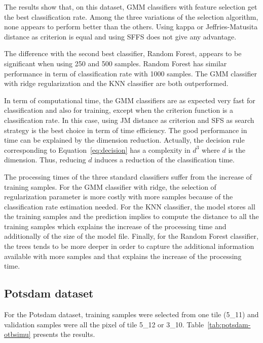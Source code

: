 \documentclass[journal]{IEEEtran}
\begin{document}
    The results show that, on this  dataset, GMM classifiers with feature selection get the best classification rate. Among the three variations of the selection algorithm, none appears to perform better than the others. Using kappa or Jeffries-Matusita distance as criterion is equal and using SFFS does not give any advantage.

    The difference with the second best classifier, Random Forest, appears to be significant when using 250 and 500 samples. Random Forest has similar performance in term of classification rate with 1000 samples. The GMM classifier with ridge regularization and the KNN classifier are both outperformed.

    In term of computational time, the GMM classifiers are as expected very fast for classification and also for training, except when the criterion function is a classification rate. In this case, using JM distance as criterion and SFS as search strategy is the best choice in term of time efficiency. The good performance in time can be explained by the dimension reduction. Actually, the decision rule corresponding to Equation~\ref{eq:decision} has a complexity in $d^3$ where $d$ is the dimension. Thus, reducing $d$ induces a reduction of the classification time.

    The processing times of the three standard classifiers suffer from the increase of training samples. For the GMM classifier with ridge, the selection of regularization parameter is more costly with more samples because of the classification rate estimation needed. For the KNN classifier, the model stores all the training samples and the prediction implies to compute the distance to all the training samples which explains the increase of the processing time and additionally of the size of the model file. Finally, for the Random Forest classifier, the trees tends to be more deeper in order to capture the additional information available with more samples and that explains the increase of the processing time.

    \subsection{Potsdam dataset}

    For the Potsdam  dataset, training samples were  selected from one
    tile (5\_11)  and validation  samples were all  the pixel  of tile
    5\_12  or  3\_10.  Table~\ref{tab:potsdam-otbsimu}  presents  the
    results.
\end{document}
